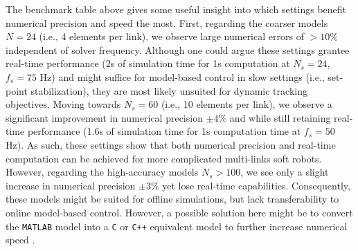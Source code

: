 \clearpage
The benchmark table above gives some useful insight into which settings benefit numerical precision and speed the most. First, regarding the coarser models $N = 24$ (i.e., 4 elements per link), we observe large numerical errors of $>\!10\%$ independent of solver frequency. Although one could argue these settings grantee real-time performance (2s of simulation time for 1s computation at $N_s = 24$, $f_s = 75$ Hz) and might suffice for model-based control in slow settings (i.e., set-point stabilization), they are most likely unsuited for dynamic tracking objectives. Moving towards $N_s = 60$ (i.e., 10 elements per link), we observe a significant improvement in numerical precision $\pm4\%$ and while still retaining real-time performance (1.6s of simulation time for 1s computation time at $f_s = 50$ Hz). As such, these settings show that both numerical precision and real-time computation can be achieved for more complicated multi-links soft robots. However, regarding the high-accuracy models $N_s > 100$, we see only a slight increase in numerical precision $\pm3\%$ yet lose real-time capabilities. Consequently, these models might be suited for offline simulations, but lack transferability to online model-based control. However, a possible solution here might be to convert the \texttt{MATLAB} model into a \texttt{C} or \texttt{C++} equivalent model to further increase numerical speed \cite{Grazioso2019,Sadati2020}.

